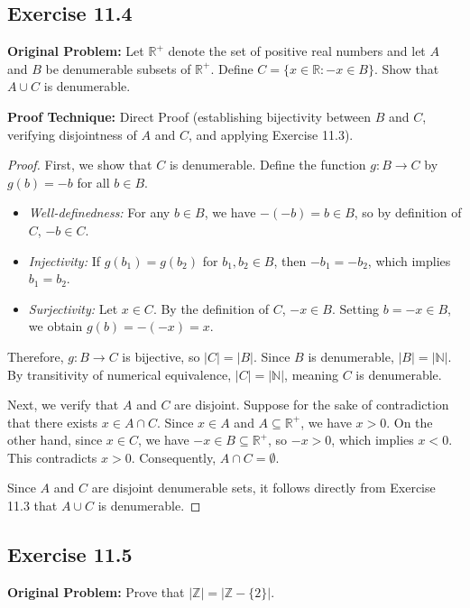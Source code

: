 \documentclass[11pt, letterpaper]{article}
\theoremstyle{definition}
\theoremstyle{remark}
\begin{document}
\subsection{Exercise 11.4}

\textbf{Original Problem:} Let $\mathbb{R}^+$ denote the set of positive real numbers and let $A$ and $B$ be denumerable subsets of $\mathbb{R}^+$. Define $C = \{x \in \mathbb{R} : -x \in B\}$. Show that $A \cup C$ is denumerable.

\textbf{Proof Technique:} Direct Proof (establishing bijectivity between $B$ and $C$, verifying disjointness of $A$ and $C$, and applying Exercise 11.3).

\begin{proof}
First, we show that $C$ is denumerable. Define the function $g : B \to C$ by $g(b) = -b$ for all $b \in B$.
\begin{itemize}
    \item \emph{Well-definedness:} For any $b \in B$, we have $-(-b) = b \in B$, so by definition of $C$, $-b \in C$.
    \item \emph{Injectivity:} If $g(b_1) = g(b_2)$ for $b_1, b_2 \in B$, then $-b_1 = -b_2$, which implies $b_1 = b_2$.
    \item \emph{Surjectivity:} Let $x \in C$. By the definition of $C$, $-x \in B$. Setting $b = -x \in B$, we obtain $g(b) = -(-x) = x$.
\end{itemize}
Therefore, $g : B \to C$ is bijective, so $|C| = |B|$. Since $B$ is denumerable, $|B| = |\mathbb{N}|$. By transitivity of numerical equivalence, $|C| = |\mathbb{N}|$, meaning $C$ is denumerable.

Next, we verify that $A$ and $C$ are disjoint. Suppose for the sake of contradiction that there exists $x \in A \cap C$. Since $x \in A$ and $A \subseteq \mathbb{R}^+$, we have $x > 0$. On the other hand, since $x \in C$, we have $-x \in B \subseteq \mathbb{R}^+$, so $-x > 0$, which implies $x < 0$. This contradicts $x > 0$. Consequently, $A \cap C = \emptyset$.

Since $A$ and $C$ are disjoint denumerable sets, it follows directly from Exercise 11.3 that $A \cup C$ is denumerable.
\end{proof}

\subsection{Exercise 11.5}

\textbf{Original Problem:} Prove that $|\mathbb{Z}| = |\mathbb{Z} - \{2\}|$.
\end{document}
